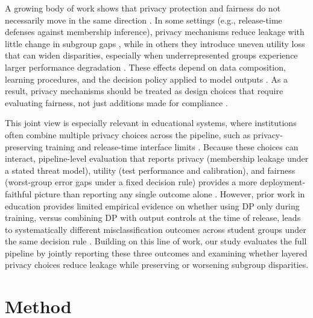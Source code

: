 \documentclass{edm_article}
\begin{document}
A growing body of work shows that privacy protection and fairness do not necessarily move in the same direction \cite{12demelius2025recent-advances-dpdl,15hu2023_mia_defenses_survey,22gu2022_privacy_accuracy_fairness_fl}. In some settings (e.g., release-time defenses against membership inference), privacy mechanisms reduce leakage with little change in subgroup gaps \cite{14jia2019_memguard,16chen2024hamp}, while in others they introduce uneven utility loss that can widen disparities, especially when underrepresented groups experience larger performance degradation \cite{18hardt2016eopp,19kleinberg2016risktradeoffs,22gu2022_privacy_accuracy_fairness_fl}. These effects depend on data composition, learning procedures, and the decision policy applied to model outputs \cite{9abadi2016_dpsgd,18hardt2016eopp,19kleinberg2016risktradeoffs,22gu2022_privacy_accuracy_fairness_fl}. As a result, privacy mechanisms should be treated as design choices that require evaluating fairness, not just additions made for compliance  \cite{10jagielski2020_auditing_dpsgd,22gu2022_privacy_accuracy_fairness_fl,28corbett-davies2023measure-mismeasure-fairness}.


This joint view is especially relevant in educational systems, where institutions often combine multiple privacy choices across the pipeline, such as privacy-preserving training and release-time interface limits \cite{3plak2022_ews_dashboard,9abadi2016_dpsgd,14jia2019_memguard}. Because these choices can interact, pipeline-level evaluation that reports privacy (membership leakage under a stated threat model), utility (test performance and calibration), and fairness (worst-group error gaps under a fixed decision rule) provides a more deployment-faithful picture than reporting any single outcome alone \cite{1shokri2017membership,18hardt2016eopp,23gardner2019_abroca_slicing_fairness}. However, prior work in education provides limited empirical evidence on whether using DP only during training, versus combining DP with output controls at the time of release, leads to systematically different misclassification outcomes across student groups under the same decision rule \cite{12demelius2025recent-advances-dpdl,21Hu2020TowardsFE,23gardner2019_abroca_slicing_fairness}. Building on this line of work, our study evaluates the full pipeline by jointly reporting these three outcomes and examining whether layered privacy choices reduce leakage while preserving or worsening subgroup disparities.




\section{Method}
\end{document}
